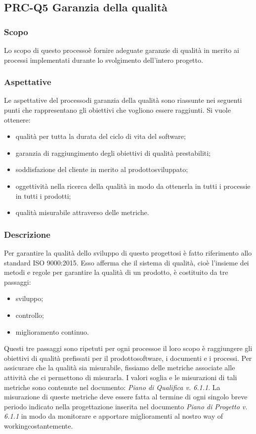 \subsection{PRC-Q5 Garanzia della qualità}
\subsubsection{Scopo}
Lo scopo di questo processo\glosp è fornire adeguate garanzie di qualità in merito ai processi implementati durante lo svolgimento dell'intero progetto\glo.
\subsubsection{Aspettative}
Le aspettative del processo\glosp di garanzia della qualità sono riassunte nei seguenti punti che rappresentano gli obiettivi che vogliono essere raggiunti. Si vuole ottenere:
\begin{itemize}
	\item qualità per tutta la durata del ciclo di vita del software;
	\item garanzia di raggiungimento degli obiettivi di qualità prestabiliti;
	\item soddisfazione del cliente in merito al prodotto\glosp sviluppato;
	\item oggettività nella ricerca della qualità in modo da ottenerla in tutti i processi\glosp e in tutti i prodotti\glo;
	\item qualità misurabile attraverso delle metriche\glo.
\end{itemize}
\subsubsection{Descrizione}
Per garantire la qualità dello sviluppo di questo progetto\glosp si è fatto riferimento allo standard ISO 9000:2015. Esso afferma che il sistema di qualità, cioè l'insieme dei metodi e regole per garantire la qualità di un prodotto\glo, è costituito da tre passaggi:
\begin{itemize}
	\item sviluppo;
	\item controllo;
	\item miglioramento continuo.
\end{itemize}
Questi tre passaggi sono ripetuti per ogni processo\glosp e il loro scopo è raggiungere gli obiettivi di qualità prefissati per il prodotto\glosp software, i documenti e i processi.
Per assicurare che la qualità sia misurabile, fissiamo delle metriche associate alle attività che ci permettono di misurarla. I valori soglia e le misurazioni di tali metriche sono contenute nel documento: \textit{Piano di Qualifica v. 6.1.1}.
La misurazione di queste metriche deve essere fatta al termine di ogni singolo breve periodo indicato nella progettazione inserita nel documento \textit{Piano di Progetto v. 6.1.1} in modo da monitorare e apportare miglioramenti al nostro way of working\glosp costantemente.
